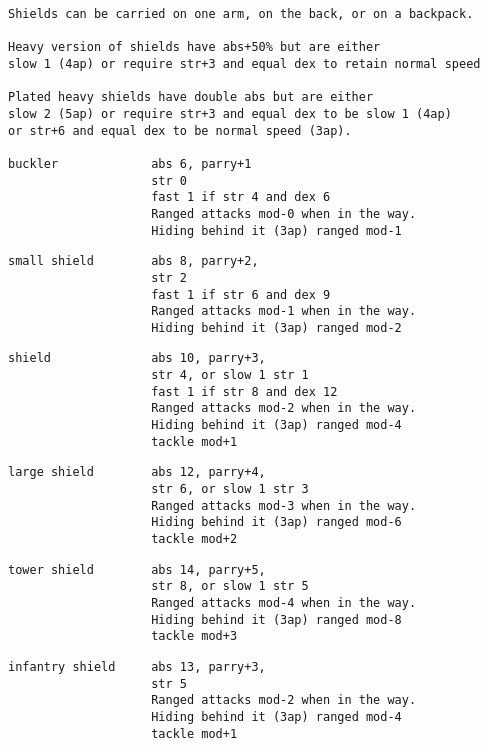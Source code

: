 \small \begin{samepage} \begin{verbatim}
Shields can be carried on one arm, on the back, or on a backpack.

Heavy version of shields have abs+50% but are either
slow 1 (4ap) or require str+3 and equal dex to retain normal speed

Plated heavy shields have double abs but are either
slow 2 (5ap) or require str+3 and equal dex to be slow 1 (4ap)
or str+6 and equal dex to be normal speed (3ap).

buckler             abs 6, parry+1
                    str 0
                    fast 1 if str 4 and dex 6
                    Ranged attacks mod-0 when in the way.
                    Hiding behind it (3ap) ranged mod-1
\end{verbatim} \blocklistgap \begin{verbatim}
small shield        abs 8, parry+2,
                    str 2
                    fast 1 if str 6 and dex 9
                    Ranged attacks mod-1 when in the way.
                    Hiding behind it (3ap) ranged mod-2
\end{verbatim} \blocklistgap \begin{verbatim}
shield              abs 10, parry+3,
                    str 4, or slow 1 str 1
                    fast 1 if str 8 and dex 12
                    Ranged attacks mod-2 when in the way.
                    Hiding behind it (3ap) ranged mod-4
                    tackle mod+1
\end{verbatim} \blocklistgap \begin{verbatim}
large shield        abs 12, parry+4,
                    str 6, or slow 1 str 3
                    Ranged attacks mod-3 when in the way.
                    Hiding behind it (3ap) ranged mod-6
                    tackle mod+2
\end{verbatim} \blocklistgap \begin{verbatim}
tower shield        abs 14, parry+5,
                    str 8, or slow 1 str 5
                    Ranged attacks mod-4 when in the way.
                    Hiding behind it (3ap) ranged mod-8
                    tackle mod+3
\end{verbatim} \blocklistgap \begin{verbatim}
infantry shield     abs 13, parry+3,
                    str 5
                    Ranged attacks mod-2 when in the way.
                    Hiding behind it (3ap) ranged mod-4
                    tackle mod+1
\end{verbatim} \end{samepage} \normalsize \goodbreak

